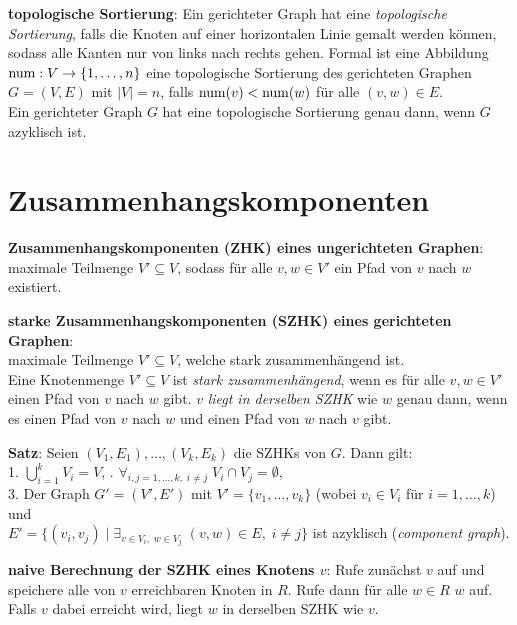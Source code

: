 \textbf{topologische Sortierung}:
Ein gerichteter Graph hat eine \emph{topologische Sortierung}, falls die
Knoten auf einer horizontalen Linie gemalt werden können, sodass
alle Kanten nur von links nach rechts gehen.
Formal ist eine Abbildung $\operatorname{num}: V \rightarrow \{1, \dotsc, n\}$ eine
topologische Sortierung des gerichteten Graphen $G = (V, E)$ mit $|V| = n$,
falls $\operatorname{num}(v) < \operatorname{num}(w)$ für alle $(v, w) \in E$. \\
Ein gerichteter Graph $G$ hat eine topologische Sortierung genau dann,
wenn $G$ azyklisch ist.

\section{%
    Zusammenhangskomponenten%
}

\textbf{Zusammenhangskomponenten (ZHK) eines ungerichteten Graphen}: \\
maximale Teilmenge $V' \subseteq V$, sodass für alle $v, w \in V'$ ein
Pfad von $v$ nach $w$ existiert.

\linie

\textbf{starke Zusammenhangskomponenten (SZHK) eines gerichteten Graphen}: \\
maximale Teilmenge $V' \subseteq V$, welche stark zusammenhängend ist. \\
Eine Knotenmenge $V' \subseteq V$ ist \emph{stark zusammenhängend}, wenn es
für alle $v, w \in V'$ einen Pfad von $v$ nach $w$ gibt.
$v$ \emph{liegt in derselben SZHK} wie $w$ genau dann, wenn es einen Pfad
von $v$ nach $w$ und einen Pfad von $w$ nach $v$ gibt.

\textbf{Satz}:
Seien $(V_1, E_1), \dotsc, (V_k, E_k)$ die SZHKs von $G$.
Dann gilt: \\
1. $\bigcup_{i=1}^k V_i = V$, \qquad{}. $\forall_{i, j = 1, \dotsc, k,\; i \not= j}\;
V_i \cap V_j = \emptyset$, \\
3. Der Graph $G' = (V', E')$ mit $V' = \{v_1, \dotsc, v_k\}$
(wobei $v_i \in V_i$ für $i = 1, \dotsc, k$) und \\
$E' = \{(v_i, v_j) \;|\;
\exists_{v \in V_i,\; w \in V_j}\; (v, w) \in E,\; i \not= j\}$ ist
azyklisch (\emph{component graph}).

\linie

\textbf{naive Berechnung der SZHK eines Knotens $v$}:
Rufe zunächst $v$\code{)} auf und speichere alle von $v$
erreichbaren Knoten in $R$.
Rufe dann für alle $w \in R$ $w$\code{)} auf.
Falls $v$ dabei erreicht wird, liegt $w$ in derselben SZHK wie $v$.


